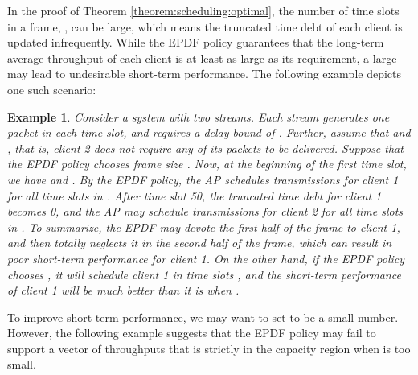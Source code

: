 \documentclass[10pt,nocopyrightspace]{sigplan-proc-varsize-1in}
\newtheorem{example}{Example}
\begin{document}
In the proof of Theorem \ref{theorem:scheduling:optimal}, the number of time slots in a frame, , can be large, which means the truncated time debt of each client is updated infrequently. While the EPDF policy guarantees that the long-term average throughput of each client is at least as large as its requirement, a large  may lead to undesirable short-term performance. The following example depicts one such scenario:

\begin{example}
Consider a system with two streams. Each stream generates one packet in each time slot, and requires a delay bound of . Further, assume that  and , that is, client 2 does not require any of its packets to be delivered. Suppose that the EPDF policy chooses frame size . Now, at the beginning of the first time slot, we have  and . By the EPDF policy, the AP schedules transmissions for client 1 for all time slots in . After time slot 50, the truncated time debt for client 1 becomes 0, and the AP may schedule transmissions for client 2 for all time slots in . To summarize, the EPDF may devote the first half of the frame to client 1, and then totally neglects it in the second half of the frame, which can result in poor short-term performance for client 1. On the other hand, if the EPDF policy chooses , it will schedule client 1 in time slots , and the short-term performance of client 1 will be much better than it is when . 
\end{example}

To improve short-term performance, we may want to set  to be a small number. However, the following example suggests that the EPDF policy may fail to support a vector of throughputs that is strictly in the capacity region when  is too small.
\end{document}
